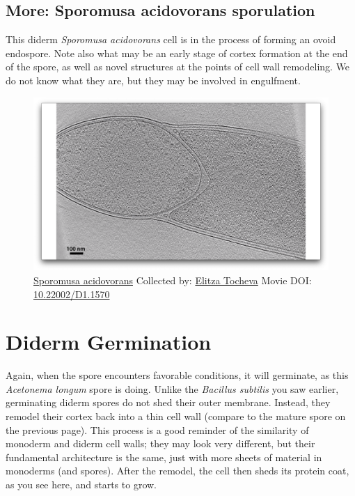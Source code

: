 \documentclass[]{tufte-book}
\begin{document}
\hypertarget{Sporomusa_acidovorans_sporulation}{\subsection*{More:
Sporomusa acidovorans
sporulation}\label{Sporomusa_acidovorans_sporulation}}

This diderm \emph{Sporomusa acidovorans} cell is in the process of
forming an ovoid endospore. Note also what may be an early stage of
cortex formation at the end of the spore, as well as novel structures at
the points of cell wall remodeling. We do not know what they are, but
they may be involved in engulfment.





\begin{figure}
\includegraphics{movie_stills/8_10c} \caption[\protect\hyperlink{tree}{Sporomusa acidovorans} Collected
by: \protect\hyperlink{elitza_tocheva}{Elitza Tocheva} Movie DOI:
\href{https://doi.org/10.22002/D1.1570}{10.22002/D1.1570}]{\protect\hyperlink{tree}{Sporomusa acidovorans} Collected
by: \protect\hyperlink{elitza_tocheva}{Elitza Tocheva} Movie DOI:
\href{https://doi.org/10.22002/D1.1570}{10.22002/D1.1570}}\label{fig:8-10c}
\end{figure}

\section{Diderm Germination}\label{diderm-germination}

Again, when the spore encounters favorable conditions, it will
germinate, as this \emph{Acetonema longum} spore is doing. Unlike the
\emph{Bacillus subtilis} you saw earlier, germinating diderm spores do
not shed their outer membrane. Instead, they remodel their cortex back
into a thin cell wall (compare to the mature spore on the previous
page). This process is a good reminder of the similarity of monoderm and
diderm cell walls; they may look very different, but their fundamental
architecture is the same, just with more sheets of material in monoderms
(and spores). After the remodel, the cell then sheds its protein coat,
as you see here, and starts to grow.
\end{document}
